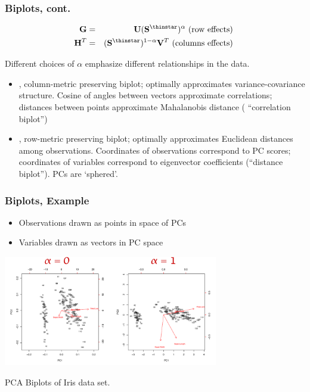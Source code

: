 \documentclass{beamer}
\begin{document}
\begin{frame}
  \frametitle{Biplots, cont.}

\begin{eqnarray*}
\Mtx{G} &=& \Mtx{U}(\Mtx{S}^{\thinstar})^{\alpha} \text{ (row effects) } \\
\Mtx{H}^T &=& (\Mtx{S}^{\thinstar})^{1-\alpha} \Mtx{V}^T \text{ (columns effects) }
\end{eqnarray*}

Different choices of $\alpha$ emphasize different relationships in the data.

\begin{itemize}
\item {}, column-metric preserving biplot; optimally approximates variance-covariance structure. Cosine of angles between vectors approximate correlations; distances between points approximate Mahalanobis distance ( ``correlation biplot'')
\item {}, row-metric preserving biplot; optimally approximates Euclidean distances among observations. Coordinates of observations correspond to PC scores; coordinates of variables correspond to eigenvector coefficients (``distance biplot''). PCs are `sphered'.
\end{itemize}

\end{frame}


\begin{frame}
  \frametitle{Biplots, Example}

\begin{itemize}
\item Observations drawn as points in space of PCs
\item Variables drawn as vectors in PC space
\end{itemize}

\medskip

\centerline{
\includegraphics[height=1.9in]{fig-irisbiplot-simple.pdf}
}
\begin{center}
PCA Biplots of Iris data set.
\end{center}

\end{frame}
\end{document}
